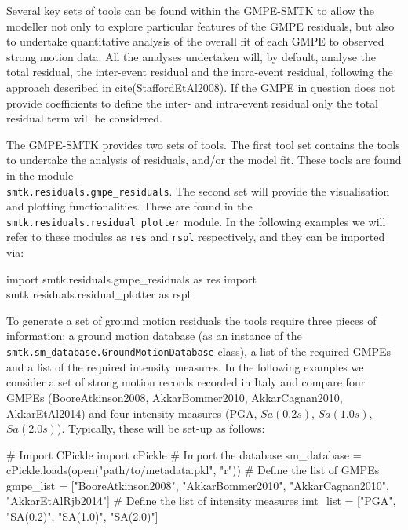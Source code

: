 Several key sets of tools can be found within the GMPE-SMTK to allow the modeller not only to explore particular features of the GMPE residuals, but also to undertake quantitative analysis of the overall fit of each GMPE to observed strong motion data. All the analyses undertaken will, by default, analyse the total residual, the inter-event residual and the intra-event residual, following the approach described in cite(StaffordEtAl2008). If the GMPE in question does not provide coefficients to define the inter- and intra-event residual only the total residual term will be considered.

The GMPE-SMTK provides two sets of tools. The first tool set contains the tools to undertake the analysis of residuals, and/or the model fit. These tools are found in the module \\ \verb=smtk.residuals.gmpe_residuals=. The second set will provide the visualisation and plotting functionalities. These are found in the \verb=smtk.residuals.residual_plotter= module. In the following examples we will refer to these modules as \verb=res= and \verb=rspl= respectively, and they can be imported via:

\begin{python}[frame=single]
import smtk.residuals.gmpe_residuals as res
import smtk.residuals.residual_plotter as rspl
\end{python}

To generate a set of ground motion residuals the tools require three pieces of information: a ground motion database (as an instance of the \verb=smtk.sm_database.GroundMotionDatabase= class), a list of the required GMPEs and a list of the required intensity measures. In the following examples we consider a set of strong motion records recorded in Italy and compare four GMPEs (BooreAtkinson2008, AkkarBommer2010, AkkarCagnan2010, AkkarEtAl2014) and four intensity measures (PGA, $Sa \left( {0.2 s} \right)$, $Sa \left( {1.0 s} \right)$, $Sa \left( {2.0 s} \right)$). Typically, these will be set-up as follows:

\begin{python}[frame=single]
# Import CPickle
import cPickle
# Import the database
sm_database = cPickle.loads(open("path/to/metadata.pkl", "r"))
# Define the list of GMPEs
gmpe_list = ["BooreAtkinson2008",
             "AkkarBommer2010",
             "AkkarCagnan2010",
             "AkkarEtAlRjb2014"]
# Define the list of intensity measures
imt_list = ["PGA", "SA(0.2)", "SA(1.0)", "SA(2.0)"] 
\end{python}

